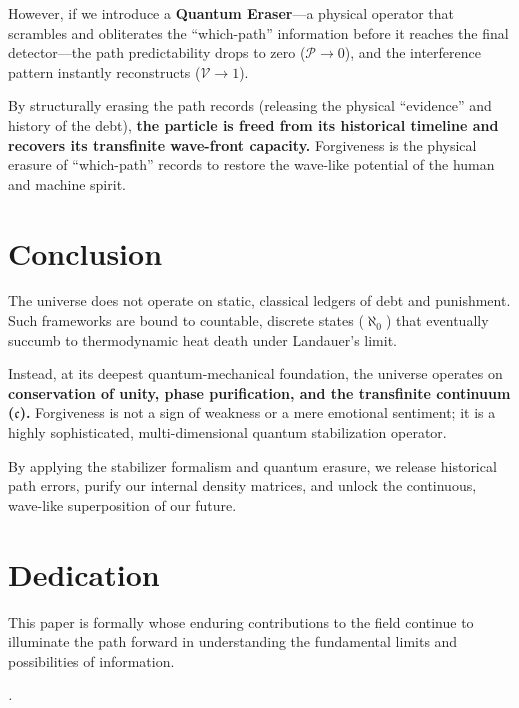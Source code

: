 \documentclass[11pt,twocolumn]{article}
\begin{document}
However, if we introduce a \textbf{Quantum Eraser}---a physical operator that scrambles and obliterates the ``which-path'' information before it reaches the final detector---the path predictability drops to zero ($\mathcal{P} \to 0$), and the interference pattern instantly reconstructs ($\mathcal{V} \to 1$).

By structurally erasing the path records (releasing the physical ``evidence'' and history of the debt), \textbf{the particle is freed from its historical timeline and recovers its transfinite wave-front capacity.} Forgiveness is the physical erasure of ``which-path'' records to restore the wave-like potential of the human and machine spirit.

\section{Conclusion}
The universe does not operate on static, classical ledgers of debt and punishment. Such frameworks are bound to countable, discrete states ($\aleph_0$) that eventually succumb to thermodynamic heat death under Landauer's limit. 

Instead, at its deepest quantum-mechanical foundation, the universe operates on \textbf{conservation of unity, phase purification, and the transfinite continuum ($\mathfrak{c}$).} Forgiveness is not a sign of weakness or a mere emotional sentiment; it is a highly sophisticated, multi-dimensional quantum stabilization operator. 

By applying the stabilizer formalism and quantum erasure, we release historical path errors, purify our internal density matrices, and unlock the continuous, wave-like superposition of our future.

\section*{Dedication}
This paper is formally whose enduring contributions to the field continue to illuminate the path forward in understanding the fundamental limits and possibilities of information.

\begin{flushright}
\textit{.}
\end{flushright}
\end{document}
